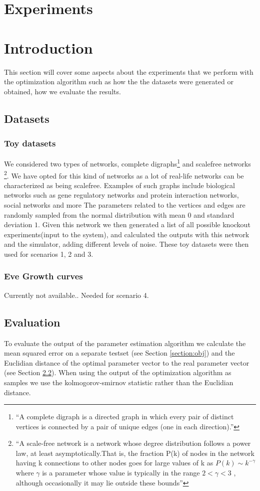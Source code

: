  \section{Experiments}
 \section{Introduction}
 This section will cover some aspects about the experiments that we perform with the optimization algorithm such as
 how the the datasets were generated or obtained, how we evaluate the results. 
 \subsection{Datasets}
 \subsubsection{Toy datasets}
 We considered two types of networks, complete digraphs\footnote{``A complete digraph is a directed graph in which every pair of distinct vertices is connected by a pair of unique edges (one in each direction).''} and scalefree networks
\footnote{``A scale-free network is a network whose degree distribution follows a power law, at least asymptotically.That is, the fraction P(k) of nodes in the network having k connections to other nodes goes for large values of k as 
$ P(k) \sim k^{-\gamma} $ where $\gamma$ is a parameter whose value is typically in the range $2 < \gamma < 3$ \cite{barabasi2004network}, although occasionally it may lie outside these bounds''}. We have opted for this
kind of networks as a lot of real-life networks can be characterized as being scalefree. Examples of such graphs include biological networks such as gene regulatory networks and protein interaction networks, social networks and more \cite{barabasi2009scale}
The parameters related to the vertices and edges are randomly sampled from the normal distribution with mean $0$ and standard deviation $1$. Given this network we then generated a list of all possible knockout experiments(input to the system), and
calculated the outputs with this network and the simulator, adding different levels of noise. These toy datasets were then used for scenarios 1, 2 and 3.
 \subsubsection{Eve Growth curves}
 Currently not available.. Needed for scenario 4.
 \subsection{Evaluation}\label{sec:eval} 
To evaluate the output of the parameter estimation algorithm we calculate the mean squared error on a separate testset (see Section \ref{section:obj}) and the Euclidian distance of the optimal
parameter vector to the real parameter vector (see Section \ref{sec:eval}). When using the output of the optimization algorithm as samples we use the kolmogorov-smirnov statistic rather than
the Euclidian distance.

